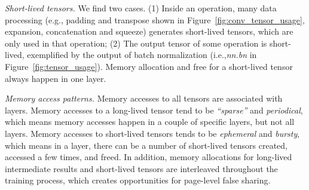 \textcolor{check}{\textit{Short-lived tensors.}
We find two cases. (1) Inside an operation, many data processing (e.g., padding and transpose shown in Figure~\ref{fig:conv_tensor_usage}, expansion, concatenation and squeeze) generates short-lived tensors, which are only used in that operation; (2) The output tensor of some operation is short-lived, exemplified by the output of batch normalization (i.e.,\textit{nn.bn} in Figure~\ref{fig:tensor_usage}). Memory allocation and free for a short-lived tensor always happen in one layer.}

\textit{Memory access patterns.}
Memory accesses to all tensors are associated with layers. Memory accesses to a long-lived tensor tend to be \textcolor{dong2}{\textit{``sparse''} and \textit{periodical}}, which means memory accesses happen in a couple of specific layers, but not all layers. Memory accesses to short-lived tensors tends to be \textcolor{dong2}{\textit{ephemeral} and \textit{bursty},} which means
in a layer, there can be a number of short-lived tensors created, accessed a few times, and freed. In addition, memory allocations for long-lived  intermediate results and short-lived tensors are interleaved throughout the training process, which creates opportunities for page-level false sharing.






